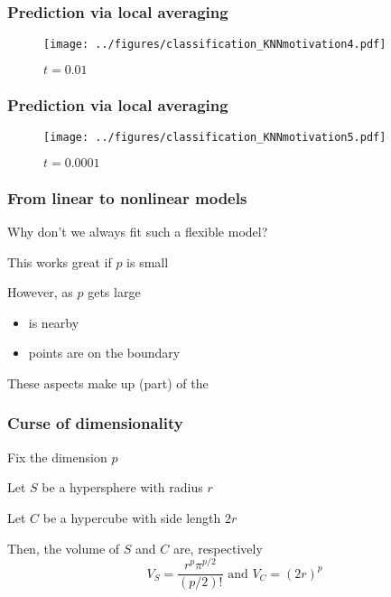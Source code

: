 \documentclass[12pt]{beamer}
\begin{document}
\begin{frame}[fragile]
\frametitle{Prediction via local averaging}
\begin{figure}
\centering
\texttt{[image: ../figures/classification\_KNNmotivation4.pdf]}
\caption{$t = 0.01$}
\end{figure}
\end{frame}

\begin{frame}[fragile]
\frametitle{Prediction via local averaging}
\begin{figure}
\centering
\texttt{[image: ../figures/classification\_KNNmotivation5.pdf]}
\caption{$t = 0.0001$}
\end{figure}
\end{frame}


\begin{frame}[fragile]
\frametitle{From linear to nonlinear models}
 Why don't we always fit such a flexible model?
\vsp

 This works great if $p$ is small 


\vsp
However, as $p$ gets large
\begin{itemize}
\item {} is nearby
\item {} points are on the boundary

\end{itemize}
\vsp

These aspects make up (part) of the 


\end{frame}

\begin{frame}[fragile]
\frametitle{Curse of dimensionality}
Fix the dimension $p$


\vsp
Let $S$ be a hypersphere with radius $r$

\vsp
Let $C$ be a hypercube with side length $2r$

\vsp
Then, the volume of $S$ and $C$ are, respectively
\[
V_S = \frac{r^{p}\pi^{p/2}}{(p/2)!} \textrm{ and } V_C = (2r)^p
\]
\end{frame}
\end{document}
